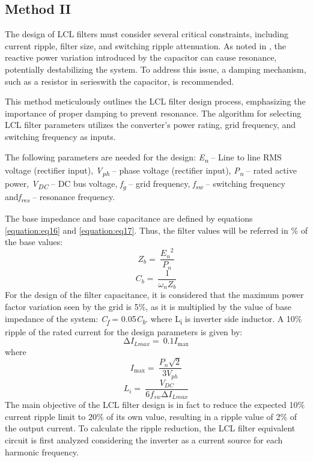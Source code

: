\documentclass[12pt,a4paper]{book}
\begin{document}
\subsection{Method II}
The design of LCL filters must consider several critical constraints, including current ripple, filter size, and switching ripple attenuation. As noted in \cite{lcl2012}, the reactive power variation introduced by the capacitor can cause resonance, potentially destabilizing the system. To address this issue, a damping mechanism, such as a resistor in serieswith the capacitor, is recommended.

This method meticulously outlines the LCL filter design process, emphasizing the importance of proper damping to prevent resonance. The algorithm for selecting LCL filter parameters utilizes the converter's power rating, grid frequency, and switching frequency as inputs.

The following parameters are needed for the design: \emph{E\textsubscript{n}} -- Line to line RMS voltage (rectifier input), \emph{V\textsubscript{ph}} -- phase voltage (rectifier input), \emph{P\textsubscript{n}} -- rated active power, \emph{V\textsubscript{DC}} -- DC bus voltage, \emph{f\textsubscript{g}} -- grid frequency, \emph{f\textsubscript{sw}} -- switching frequency and\emph{f\textsubscript{res}} -- resonance frequency.

The base impedance and base capacitance are defined by equations \ref{equation:eq16} and \ref{equation:eq17}. Thus, the filter values will be referred in \% of the base values:
\begin{equation}
  Z_{b} = \ \frac{{E_{n}}^{2}}{P_{n}}
  \label{equation:eq16}
\end{equation}
\begin{equation}
  C_{b} = \ \frac{1}{\omega_{n}Z_{b}}
  \label{equation:eq17}
\end{equation}
For the design of the filter capacitance, it is considered that the maximum power factor variation seen by the grid is 5\%, as it is multiplied by the value of base impedance of the system: \emph{C\textsubscript{f}} = 0.05\emph{C\textsubscript{b}}. where L\textsubscript{i} is inverter side inductor. A 10\% ripple of the rated current for the design parameters is given by:
\begin{equation}
  {\mathrm{\Delta}I}_{Lmax} = \ 0.1I_{\max}
  \label{equation:eq18}
\end{equation}
where
\begin{equation}
  I_{\max} = \ \frac{P_{n}\sqrt{2}}{{3V}_{ph}}
  \label{equation:eq19}
\end{equation}
\begin{equation}
  L_{i} = \ \frac{V_{DC}}{6f_{sw}{\mathrm{\Delta}I}_{Lmax}}
  \label{equation:eq20}
\end{equation}
The main objective of the LCL filter design is in fact to reduce the expected 10\% current ripple limit to 20\% of its own value, resulting in a ripple value of 2\% of the output current. To calculate the ripple reduction, the LCL filter equivalent circuit is first analyzed considering the inverter as a current source for each harmonic frequency.
\end{document}
